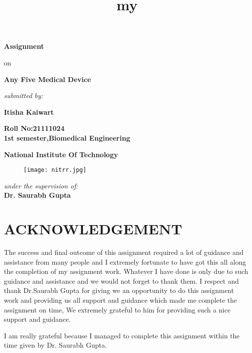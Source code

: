 \documentclass[12pt]{article}
\title{my}
\begin{document}
\centering\huge\textbf{Assignment}

\centering\large on

\centering\huge\textbf{Any Five Medical Device}


\vspace{1cm}

\centering\LARGE\textit{submitted by:}

\centering\LARGE\textbf{Itisha Kaiwart}

\begin{center}
\begin{Large}
\textbf{Roll No:21111024}\\
\vspace{0.4cm}
\textbf{1st semester,Biomedical Engineering}
\end{Large}
\end{center}


\vspace{0.5cm}

\centering\Large\textbf{National Institute Of Technology}

\begin{figure}[h]
\centering
\texttt{[image: nitrr.jpg]}
\end{figure}

\centering\LARGE\textit{under the supervision of: }      \\
 \centering\Large\textbf{Dr. Saurabh Gupta}

\pagebreak

\tableofcontents

\pagebreak 
\section{\LARGE\centering\textbf{ACKNOWLEDGEMENT}}
 
\large\flushleft The success and final outcome of this assignment required a lot of guidance and assistance from many people and I extremely fortunate to have got this all along the completion of my assignment work. Whatever I have done is only due to such guidance and assistance and we would not forget to thank them. I respect and thank Dr.Saurabh Gupta for giving we an opportunity to do this assignment work and providing us all support and guidance which made me complete the assignment on time, We extremely grateful to him for providing such a nice support and guidance.

\vspace{1cm}
I am really grateful because I managed to complete this assignment within the time given by Dr. Saurabh Gupta. 
\pagebreak
\end{document}
